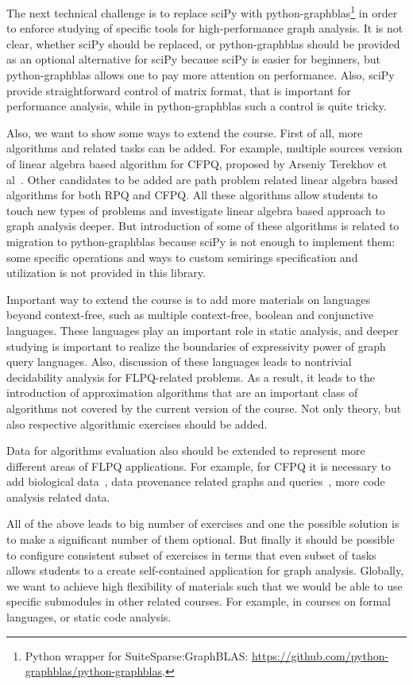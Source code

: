 \documentclass[sigconf]{acmart}
\begin{document}
The next technical challenge is to replace sciPy with python-graphblas\footnote{Python wrapper for SuiteSparse:GraphBLAS: \url{https://github.com/python-graphblas/python-graphblas}.} in order to enforce studying of specific tools for high-performance graph analysis. 
It is not clear, whether sciPy should be replaced, or python-graphblas should be provided as an optional alternative for sciPy because sciPy is easier for beginners, but python-graphblas allows one to pay more attention on performance.
Also, sciPy provide straightforward control of matrix format, that is important for performance analysis, while in python-graphblas such a control is quite tricky.

Also, we want to show some ways to extend the course. 
First of all, more algorithms and related tasks can be added.
For example, multiple sources version of linear algebra based algorithm for CFPQ, proposed by Arseniy Terekhov et al~\cite{terekhov2021multiple}.
Other candidates to be added are path problem related linear algebra based algorithms for both RPQ and CFPQ.
All these algorithms allow students to touch new types of problems and investigate linear algebra based approach to graph analysis deeper.
But introduction of some of these algorithms is related to migration to python-graphblas because sciPy is not enough to implement them: some specific operations and ways to custom semirings specification and utilization is not provided in this library.

Important way to extend the course is to add more materials on languages beyond context-free, such as multiple context-free, boolean and conjunctive languages. 
These languages play an important role in static analysis, and deeper studying is important to realize the boundaries of expressivity power of graph query languages.
Also, discussion of these languages leads to nontrivial decidability analysis for FLPQ-related problems.
As a result, it leads to the introduction of approximation algorithms that are an important class of algorithms not covered by the current version of the course.
Not only theory, but also respective algorithmic exercises should be added.

Data for algorithms evaluation also should be extended to represent more different areas of FLPQ applications.
For example, for CFPQ it is necessary to add biological data~\cite{SevonEronen+2008+157+172}, data provenance related graphs and queries~\cite{8731467}, more code analysis related data.

All of the above leads to big number of exercises and one the possible solution is to make a significant number of them optional.
But finally it should be possible to configure consistent subset of exercises in terms that even subset of tasks allows students to a create self-contained application for graph analysis.
Globally, we want to achieve high flexibility of materials such that we would be able to use specific submodules in other related courses.
For example, in courses on formal languages, or static code analysis.




\end{document}
